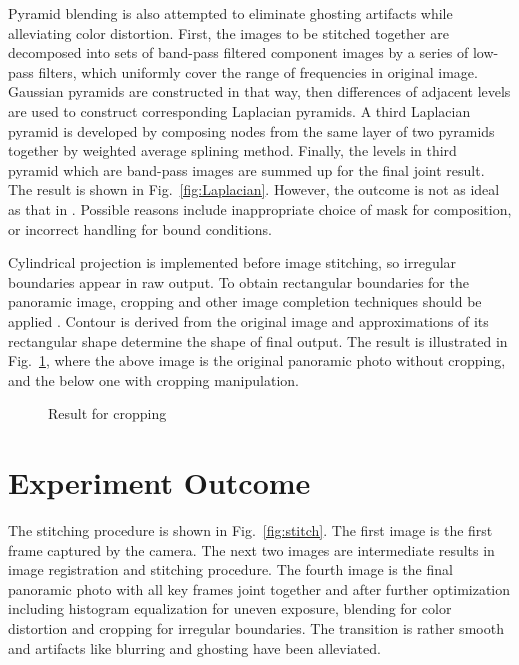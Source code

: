 \documentclass[runningheads]{llncs}
\begin{document}
Pyramid blending is also attempted to eliminate ghosting artifacts while alleviating color distortion. First, the images to be stitched together are decomposed into sets of band-pass filtered component images by a series of low-pass filters, which uniformly cover the range of frequencies in original image. Gaussian pyramids are constructed in that way, then differences of adjacent levels are used to construct corresponding Laplacian pyramids. A third Laplacian pyramid is developed by composing nodes from the same layer of two pyramids together by weighted average splining method. Finally, the levels in third pyramid which are band-pass images are summed up for the final joint result. The result is shown in Fig.~\ref{fig:Laplacian}. However, the outcome is not as ideal as that in \cite{burt1983multiresolution}. Possible reasons include inappropriate choice of mask for composition, or incorrect handling for bound conditions.

Cylindrical projection is implemented before image stitching, so irregular boundaries appear in raw output. To obtain rectangular boundaries for the panoramic image, cropping and other image completion techniques should be applied \cite{he2013rectangling}. Contour is derived from the original image and approximations of its rectangular shape determine the shape of final output.  The result is illustrated in Fig.~\ref{fig:cropping}, where the above image is the original panoramic photo without cropping, and the below one with cropping manipulation.

\begin{figure}[h!]
\centering
{}


\caption{Result for cropping}
\label{fig:cropping}
\end{figure}


\section{Experiment Outcome}
\label{sec:result}
The stitching procedure is shown in Fig.~\ref{fig:stitch}. The first image is the first frame captured by the camera. The next two images are intermediate results in image registration and stitching procedure. The fourth image is the final panoramic photo with all key frames joint together and after further optimization including histogram equalization for uneven exposure, blending for color distortion and cropping for irregular boundaries. The transition is rather smooth and artifacts like blurring and ghosting have been alleviated.
\end{document}
